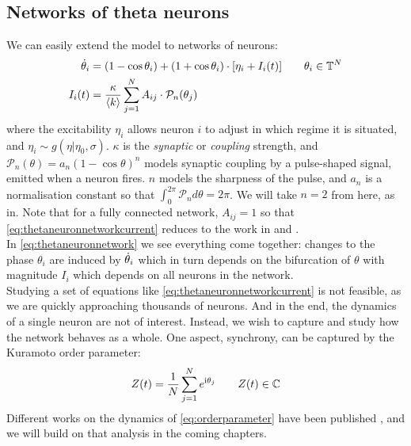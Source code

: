 \subsection{Networks of theta neurons}
We can easily extend the model to networks of neurons:
\begin{align}
\dot{\theta}_{i} &=\left(1-\cos \theta_{i}\right)+\left(1+\cos \theta_{i}\right) \cdot \left[\eta_{i} + I_{i}(t)\right] \qquad \theta_i \in \T^N  \label{eq:thetaneuronnetwork} \\
I_{i}(t) &=\frac{\kappa}{\kmean} \sum_{j=1}^{N} A_{i j} \cdot \mathcal{P}_{n}(\theta_{j}) \label{eq:thetaneuronnetworkcurrent}
\end{align}
where the excitability $\eta_i$ allows neuron $i$ to adjust in which regime it is situated, and $\eta_i \sim g(\eta \rvert \eta_0, \sigma)$. $\kappa$ is the \textsl{synaptic} or \textsl{coupling} strength, and $\mathcal{P}_n(\theta)  = a_n(1 - \cos \theta)^n$ models synaptic coupling by a pulse-shaped signal, emitted when a neuron fires. $n$ models the sharpness of the pulse, and $a_n$ is a normalisation constant so that $\int_{0}^{2 \pi} \mathcal{P}_{n} d \theta=2 \pi$. We will take $n=2$ from here, as in\cite{Luke2013, OttAntonsen2017, Martens2020}. 
Note that for a fully connected network, $A_{ij} = 1$ so that \eqref{eq:thetaneuronnetworkcurrent} reduces to the work in \cite{Luke2013} and \cite{Martens2020}. \\

In \eqref{eq:thetaneuronnetwork} we see everything come together: changes to the phase $\theta_i$ are induced by ${\dot{\theta}}_i$ which in turn depends on the bifurcation of $\theta$ with magnitude $I_i$ which depends on all neurons in the network. \\

Studying a set of equations like \eqref{eq:thetaneuronnetworkcurrent} is not feasible, as we are quickly approaching thousands of neurons. And in the end, the dynamics of a single neuron are not of interest. Instead, we wish to capture and study how the network behaves as a whole. One aspect, synchrony, can be captured by the Kuramoto order parameter:
\begin{align}
Z(t) = \frac{1}{N} \sum_{j=1}^N e^{{\rm{i}}\theta_j}  \qquad Z(t) \in {\mathbb{C}} \label{eq:orderparameter}
\end{align}
Different works on the dynamics of \eqref{eq:orderparameter} have been published \cite{Luke2013, Martens2020}, and we will build on that analysis in the coming chapters.

